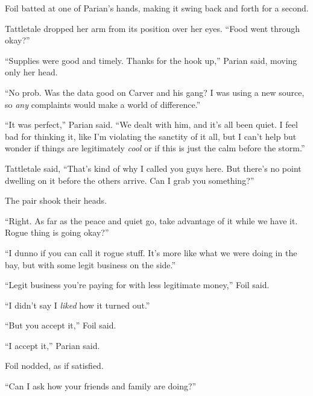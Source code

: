 Foil batted at one of Parian's hands, making it swing back and forth for a second.



Tattletale dropped her arm from its position over her eyes.  ``Food went through okay?''



``Supplies were good and timely.  Thanks for the hook up,'' Parian said, moving only her head.



``No prob.  Was the data good on Carver and his gang?  I was using a new source, so \emph{any }complaints would make a world of difference.''



``It was perfect,'' Parian said.  ``We dealt with him, and it's all been quiet.  I feel bad for thinking it, like I'm violating the sanctity of it all, but I can't help but wonder if things are legitimately \emph{cool} or if this is just the calm before the storm.''



Tattletale said, ``That's kind of why I called you guys here.  But there's no point dwelling on it before the others arrive.  Can I grab you something?''



The pair shook their heads.



``Right.  As far as the peace and quiet go, take advantage of it while we have it.  Rogue thing is going okay?''



``I dunno if you can call it rogue stuff.  It's more like what we were doing in the bay, but with some legit business on the side.''



``Legit business you're paying for with less legitimate money,'' Foil said.



``I didn't say I \emph{liked} how it turned out.''



``But you accept it,'' Foil said.



``I accept it,'' Parian said.



Foil nodded, as if satisfied.



``Can I ask how your friends and family are doing?''



